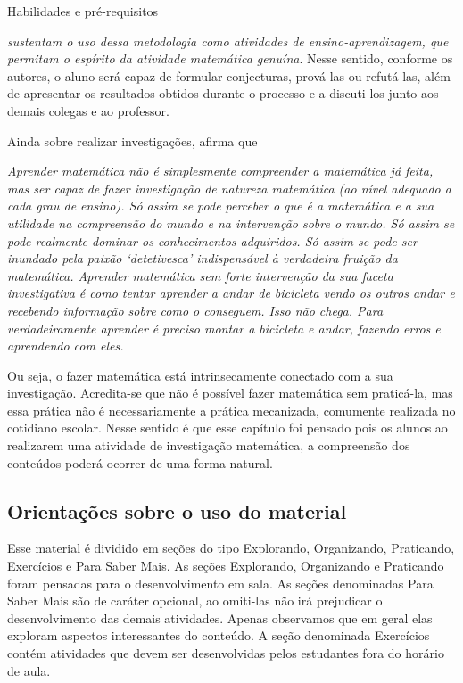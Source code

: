 \begin{apresentacao}{Habilidades e pré-requisitos}
{\citet[p. 23]{Ponte1} \textit{sustentam o uso dessa metodologia como atividades de ensino-aprendizagem, que permitam o espírito da atividade matemática genuína}. Nesse sentido, conforme os autores, o aluno será capaz de formular conjecturas, prová-las ou refutá-las, além de apresentar os resultados obtidos durante o processo e a discuti-los junto aos demais colegas e ao professor.

Ainda sobre realizar investigações, \citet[p. 5]{Braumann} afirma que 

\textit{Aprender matemática não é simplesmente compreender a matemática já feita, mas ser capaz de fazer investigação de natureza matemática (ao nível adequado a cada grau de ensino). Só assim se pode perceber o que é a matemática e a sua utilidade na compreensão do mundo e na intervenção sobre o mundo. Só assim se pode realmente dominar os conhecimentos adquiridos. Só assim se pode ser inundado pela paixão ‘detetivesca’ indispensável à verdadeira fruição da matemática. Aprender matemática sem forte intervenção da sua faceta investigativa é como tentar aprender a andar de bicicleta vendo os outros andar e recebendo informação sobre como o conseguem. Isso não chega. Para verdadeiramente aprender é preciso montar a bicicleta e andar, fazendo erros e aprendendo com eles.} 

Ou seja, o fazer matemática está intrinsecamente conectado com a sua investigação. Acredita-se que não é possível fazer matemática sem praticá-la, mas essa prática não é necessariamente a prática mecanizada, comumente realizada no cotidiano escolar. Nesse sentido é que esse capítulo foi pensado pois os alunos ao realizarem uma atividade de investigação matemática, a compreensão dos conteúdos poderá ocorrer de uma forma natural. 

\subsection{Orientações sobre o uso do material}

Esse material é dividido em seções do tipo Explorando, Organizando, Praticando, Exercícios e Para Saber Mais. As seções Explorando, Organizando e Praticando foram pensadas para o desenvolvimento em sala. As seções denominadas Para Saber Mais são de caráter opcional, ao omiti-las não irá prejudicar o desenvolvimento das demais atividades. Apenas observamos que em geral elas exploram aspectos interessantes do conteúdo. A seção denominada Exercícios contém atividades que devem ser desenvolvidas pelos estudantes fora do horário de aula. 

}
\end{apresentacao}
